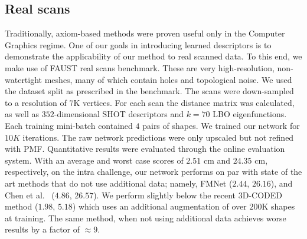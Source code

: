 \documentclass[10pt,twocolumn,letterpaper]{article}
\newcommand\comment[1]{{}}
\newcommand{\bb}[1]{\bm{\mathrm{#1}}}
\begin{document}
\subsection{Real scans}
Traditionally, axiom-based methods were proven useful only in the Computer Graphics regime. One of our goals in introducing learned descriptors is to demonstrate the applicability of our method to real scanned data. To this end, we make use of FAUST real scans benchmark. These are very high-resolution, non-watertight meshes, many of which contain holes and topological noise.
We used the dataset split as prescribed in the benchmark. The scans were down-sampled to a resolution of $7$K vertices. For each scan the distance matrix was calculated, as well as $352$-dimensional SHOT descriptors and $k=70$ LBO eigenfunctions. Each training mini-batch contained $4$ pairs of shapes. We trained our network for $10K$ iterations. The raw network predictions were only upscaled but not refined with PMF. \comment{Several qualitative results are provided in Figure \ref{fig:faust_scans}.}Quantitative results were evaluated through the online evaluation system. With an average and worst case scores of $\bb{2.51}$ cm and \textbf{$\bb{24.35}$} cm, respectively,  on the intra challenge, our network performs on par with state of the art methods that do not use additional data; namely, FMNet ($2.44$, $26.16$), and Chen et al.~\cite{chen2015robust} ($4.86$, $26.57$). We perform slightly below the recent 3D-CODED method  \cite{groueix2018b} ($1.98$, $5.18$) which uses an additional augmentation of over $200$K shapes at training. The same method, when not using additional data achieves worse results by a factor of $\approx 9$. 

\comment{\oshri{Practically the bottleneck for ultimate results on FAUST scans was the topological changes. I can make an experiment with diffusion distances for the supplementary}
\orl{We should definitely do it. But as far as I know, we can't show *new* results in the supp.}}
\comment{
\begin{figure}
    \texttt{[image: scans\_final.png]}
    \caption{\label{fig:faust_scans}Visualization of FAUST scans test results \oshri{placeholder}}
\end{figure}
}
\end{document}
